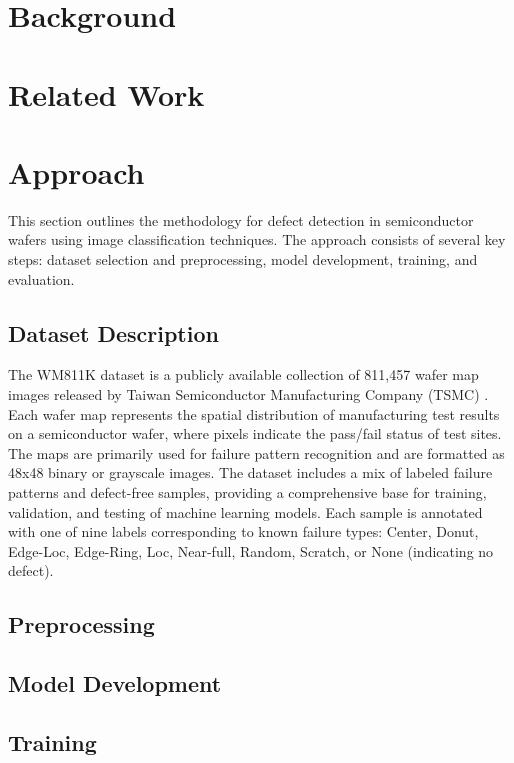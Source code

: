 \documentclass[conference]{IEEEtran}
\begin{document}
\section{Background}


\section{Related Work} 


\section{Approach} 
This section outlines the methodology for defect detection in semiconductor wafers using image classification techniques.
The approach consists of several key steps: dataset selection and preprocessing, model development, training, and evaluation.

\subsection{Dataset Description}
The WM811K dataset is a publicly available collection of 811,457 wafer map images released by Taiwan Semiconductor Manufacturing Company (TSMC) \cite{b2}. 
Each wafer map represents the spatial distribution of manufacturing test results on a semiconductor wafer, where pixels indicate the pass/fail status of test sites. 
The maps are primarily used for failure pattern recognition and are formatted as 48x48 binary or grayscale images. 
The dataset includes a mix of labeled failure patterns and defect-free samples, providing a comprehensive base for training, validation, and testing of machine learning models.
Each sample is annotated with one of nine labels corresponding to known failure types: Center, Donut, Edge-Loc, Edge-Ring, Loc, Near-full, Random, Scratch, or None (indicating no defect). 

\subsection{Preprocessing}


\subsection{Model Development}


\subsection{Training}
\end{document}
